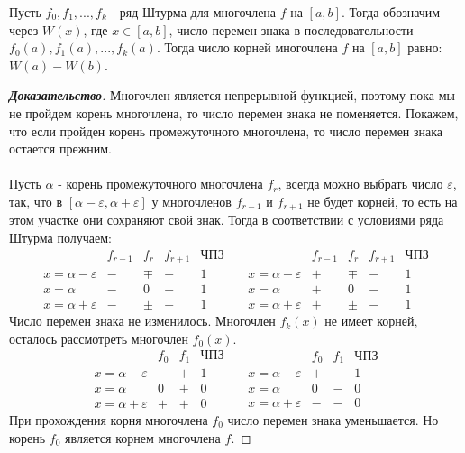 \documentclass[12pt]{article}
\begin{document}
\begin{thm}
Пусть $f_0, f_1, ..., f_k$ - ряд Штурма для многочлена $f$ на $[a,b]$. Тогда обозначим через $W(x)$, где $x \in [a,b]$, число перемен знака в последовательности $f_0(a), f_1(a), ..., f_k(a)$. Тогда число корней многочлена $f$ на $[a,b]$ равно: $W(a) - W(b)$.
\end{thm}
\begin{proof}[\textbf{Доказательство}]
Многочлен является непрерывной функцией, поэтому пока мы не пройдем корень многочлена, то число перемен знака не поменяется. Покажем, что если пройден корень промежуточного многочлена, то число перемен знака остается прежним. \\
\\
\indent Пусть $\alpha$ - корень промежуточного многочлена $f_r$, всегда можно выбрать число $\varepsilon$, так, что в $[\alpha - \varepsilon,  \alpha + \varepsilon]$ у многочленов $f_{r-1}$ и $f_{r+1}$ не будет корней, то есть на этом участке они сохраняют свой знак. Тогда в соответствии с условиями ряда Штурма получаем: \\
$$\begin{array}{c|c|c|c|c}
        & f_{r-1} & f_r & f_{r+1} & \textit{ЧПЗ} \\ \hline
      x = \alpha - \varepsilon & - & \mp  & + & 1 \\  \hline
      x = \alpha & - & 0  & + & 1 \\  \hline
      x = \alpha + \varepsilon & - & \pm  & + & 1
\end{array}
~~~~~
\begin{array}{c|c|c|c|c}
        & f_{r-1} & f_r & f_{r+1} & \textit{ЧПЗ} \\ \hline
      x = \alpha - \varepsilon & + & \mp  & - & 1 \\  \hline
      x = \alpha & + & 0  & - & 1 \\  \hline
      x = \alpha + \varepsilon & + & \pm  & - & 1
\end{array}
$$
\indent Число перемен знака не изменилось. Многочлен $f_k(x)$ не имеет корней, осталось рассмотреть многочлен $f_0(x)$.
$$\begin{array}{c|c|c|c}
        & f_0 & f_1 & \textit{ЧПЗ} \\ \hline
      x = \alpha - \varepsilon & - & + & 1 \\  \hline
      x = \alpha & 0  & + & 0 \\  \hline
      x = \alpha + \varepsilon & + & + & 0
\end{array}
~~~~~
\begin{array}{c|c|c|c}
        & f_0 & f_1 & \textit{ЧПЗ} \\ \hline
      x = \alpha - \varepsilon & + & - & 1 \\  \hline
      x = \alpha & 0  & - & 0 \\  \hline
      x = \alpha + \varepsilon & - & - & 0
\end{array}$$
\indent При прохождения корня многочлена $f_0$ число перемен знака уменьшается. Но корень $f_0$ является корнем многочлена $f$.
\end{proof}
\end{document}
